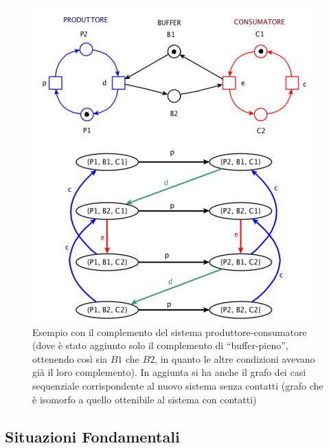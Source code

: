 \documentclass[a4paper,12pt, oneside]{book}
\begin{document}
 \begin{figure}[H]
  \centering
  \includegraphics[scale = 0.6]{img/con3.jpg}
  \caption{Esempio con il complemento del sistema produttore-consumatore (dove è
    stato aggiunto solo il complemento di ``buffer-pieno'', ottenendo così sia
    $B1$ che $B2$, in quanto le altre condizioni avevano già il loro
    complemento). In aggiunta si ha anche il grafo dei casi sequenziale
    corrispondente al nuovo sistema senza contatti (grafo che è isomorfo a
    quello ottenibile al sistema con contatti)} 
\end{figure}
\subsection{Situazioni Fondamentali}
\end{document}
